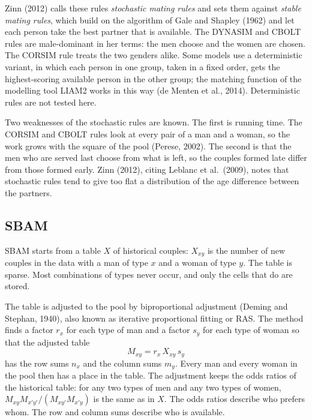 \documentclass[12pt,a4paper]{article}
\begin{document}
Zinn (2012) calls these rules \emph{stochastic mating rules} and sets them against \emph{stable
mating rules}, which build on the algorithm of Gale and Shapley (1962) and let each person take
the best partner that is available. The DYNASIM and CBOLT rules are male-dominant in her terms:
the men choose and the women are chosen. The CORSIM rule treats the two genders alike. Some
models use a deterministic variant, in which each person in one group, taken in a fixed order,
gets the highest-scoring available person in the other group; the matching function of the
modelling tool LIAM2 works in this way (de Menten et al., 2014). Deterministic rules are not
tested here.

Two weaknesses of the stochastic rules are known. The first is running time. The CORSIM and CBOLT
rules look at every pair of a man and a woman, so the work grows with the square of the pool
(Perese, 2002). The second is that the men who are served last choose from what is left, so the
couples formed late differ from those formed early. Zinn (2012), citing Leblanc et al.\ (2009),
notes that stochastic rules tend to give too flat a distribution of the age difference between
the partners.

\subsection{SBAM}

SBAM starts from a table $X$ of historical couples: $X_{xy}$ is the number of new couples in the
data with a man of type $x$ and a woman of type $y$. The table is sparse. Most combinations of
types never occur, and only the cells that do are stored.

The table is adjusted to the pool by biproportional adjustment (Deming and Stephan, 1940), also
known as iterative proportional fitting or RAS. The method finds a factor $r_x$ for each type of
man and a factor $s_y$ for each type of woman so that the adjusted table
\begin{equation}
M_{xy} = r_x \, X_{xy} \, s_y
\label{eq:ras}
\end{equation}
has the row sums $n_x$ and the column sums $m_y$. Every man and every woman in the pool then has
a place in the table. The adjustment keeps the odds ratios of the historical table: for any two
types of men and any two types of women, $M_{xy}M_{x'y'}/(M_{xy'}M_{x'y})$ is the same as in $X$.
The odds ratios describe who prefers whom. The row and column sums describe who is available.
\end{document}

